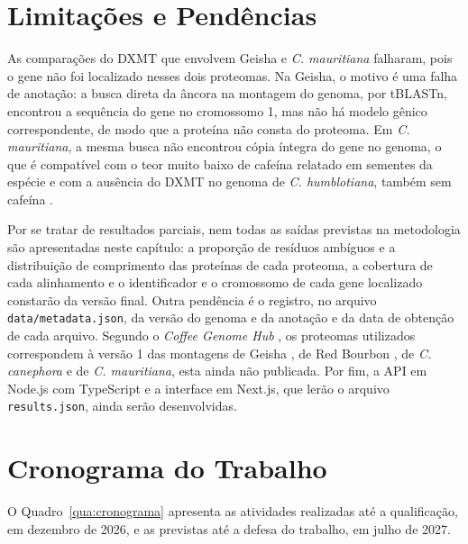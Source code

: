 \section{Limitações e Pendências}

As comparações do DXMT que envolvem Geisha e \textit{C. mauritiana} falharam, pois o gene não foi localizado nesses dois proteomas. Na Geisha, o motivo é uma falha de anotação: a busca direta da âncora na montagem do genoma, por tBLASTn, encontrou a sequência do gene no cromossomo 1, mas não há modelo gênico correspondente, de modo que a proteína não consta do proteoma. Em \textit{C. mauritiana}, a mesma busca não encontrou cópia íntegra do gene no genoma, o que é compatível com o teor muito baixo de cafeína relatado em sementes da espécie e com a ausência do DXMT no genoma de \textit{C. humblotiana}, também sem cafeína \cite{Raharimalala2021}.

Por se tratar de resultados parciais, nem todas as saídas previstas na metodologia são apresentadas neste capítulo: a proporção de resíduos ambíguos e a distribuição de comprimento das proteínas de cada proteoma, a cobertura de cada alinhamento e o identificador e o cromossomo de cada gene localizado constarão da versão final. Outra pendência é o registro, no arquivo \texttt{data/metadata.json}, da versão do genoma e da anotação e da data de obtenção de cada arquivo. Segundo o \textit{Coffee Genome Hub} \cite{CoffeeHub}, os proteomas utilizados correspondem à versão 1 das montagens de Geisha \cite{Medrano2025}, de Red Bourbon \cite{Scalabrin2024}, de \textit{C. canephora} \cite{Denoeud2014} e de \textit{C. mauritiana}, esta ainda não publicada. Por fim, a API em Node.js com TypeScript e a interface em Next.js, que lerão o arquivo \texttt{results.json}, ainda serão desenvolvidas.

\section{Cronograma do Trabalho}

O Quadro~\ref{qua:cronograma} apresenta as atividades realizadas até a qualificação, em dezembro de 2026, e as previstas até a defesa do trabalho, em julho de 2027.

